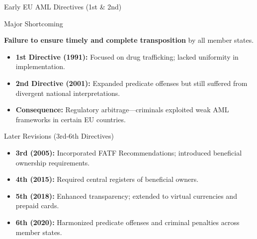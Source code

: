 \documentclass{beamer}
\begin{document}
	\begin{frame}{Early EU AML Directives (1st \& 2nd)}
		\begin{block}{Major Shortcoming}
			\begin{center}
				\textbf{Failure to ensure timely and complete transposition} by all member states.
			\end{center}
		\end{block}
		\begin{itemize}
			\item \textbf{1st Directive (1991):} Focused on drug trafficking; lacked uniformity in implementation.
			\item \textbf{2nd Directive (2001):} Expanded predicate offenses but still suffered from divergent national interpretations.
			\item \textbf{Consequence:} Regulatory arbitrage—criminals exploited weak AML frameworks in certain EU countries.
		\end{itemize}
		\begin{block}{Later Revisions (3rd-6th Directives)}
			\begin{itemize}
				\item \textbf{3rd (2005):} Incorporated FATF Recommendations; introduced beneficial ownership requirements.
				\item \textbf{4th (2015):} Required central registers of beneficial owners.
				\item \textbf{5th (2018):} Enhanced transparency; extended to virtual currencies and prepaid cards.
				\item \textbf{6th (2020):} Harmonized predicate offenses and criminal penalties across member states.
			\end{itemize}
		\end{block}
	\end{frame}
	
\end{document}
